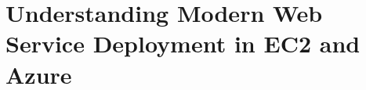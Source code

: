 \section{Understanding Modern Web Service Deployment in EC2 and Azure}
\label{cloudmeasure}






%

